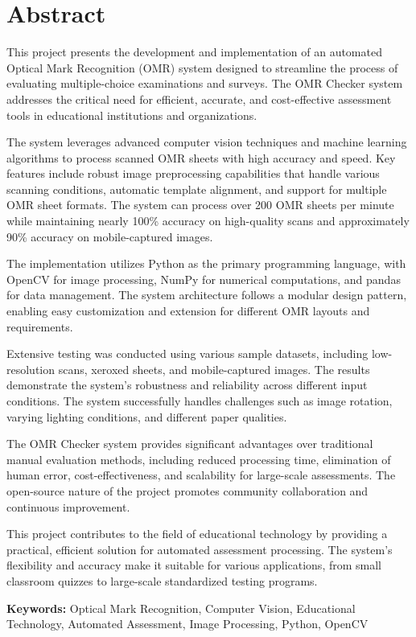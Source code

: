 \chapter*{Abstract}

This project presents the development and implementation of an automated Optical Mark Recognition (OMR) system designed to streamline the process of evaluating multiple-choice examinations and surveys. The OMR Checker system addresses the critical need for efficient, accurate, and cost-effective assessment tools in educational institutions and organizations.

The system leverages advanced computer vision techniques and machine learning algorithms to process scanned OMR sheets with high accuracy and speed. Key features include robust image preprocessing capabilities that handle various scanning conditions, automatic template alignment, and support for multiple OMR sheet formats. The system can process over 200 OMR sheets per minute while maintaining nearly 100\% accuracy on high-quality scans and approximately 90\% accuracy on mobile-captured images.

The implementation utilizes Python as the primary programming language, with OpenCV for image processing, NumPy for numerical computations, and pandas for data management. The system architecture follows a modular design pattern, enabling easy customization and extension for different OMR layouts and requirements.

Extensive testing was conducted using various sample datasets, including low-resolution scans, xeroxed sheets, and mobile-captured images. The results demonstrate the system's robustness and reliability across different input conditions. The system successfully handles challenges such as image rotation, varying lighting conditions, and different paper qualities.

The OMR Checker system provides significant advantages over traditional manual evaluation methods, including reduced processing time, elimination of human error, cost-effectiveness, and scalability for large-scale assessments. The open-source nature of the project promotes community collaboration and continuous improvement.

This project contributes to the field of educational technology by providing a practical, efficient solution for automated assessment processing. The system's flexibility and accuracy make it suitable for various applications, from small classroom quizzes to large-scale standardized testing programs.

\textbf{Keywords:} Optical Mark Recognition, Computer Vision, Educational Technology, Automated Assessment, Image Processing, Python, OpenCV